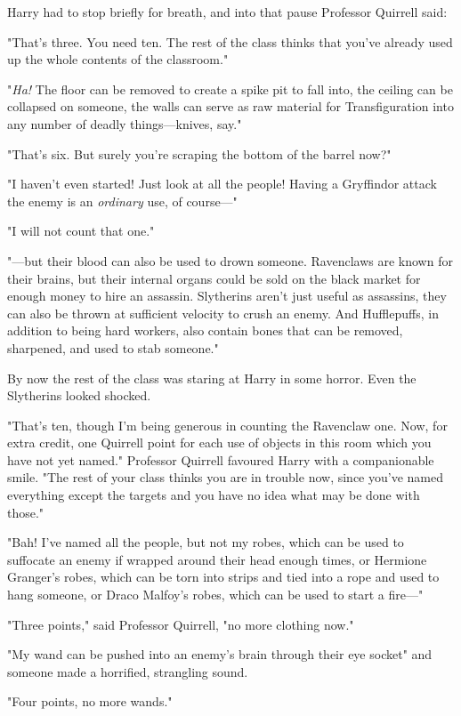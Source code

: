Harry had to stop briefly for breath, and into that pause Professor Quirrell
said:

"That’s three. You need ten. The rest of the class thinks that you’ve already
used up the whole contents of the classroom."

"\emph{Ha!} The floor can be removed to create a spike pit to fall into, the
ceiling can be collapsed on someone, the walls can serve as raw material for
Transfiguration into any number of deadly things—knives, say."

"That’s six. But surely you’re scraping the bottom of the barrel now?"

"I haven’t even started! Just look at all the people! Having a Gryffindor
attack the enemy is an \emph{ordinary} use, of course—"

"I will not count that one."

"—but their blood can also be used to drown someone. Ravenclaws are known for
their brains, but their internal organs could be sold on the black market for
enough money to hire an assassin. Slytherins aren’t just useful as assassins,
they can also be thrown at sufficient velocity to crush an enemy. And
Hufflepuffs, in addition to being hard workers, also contain bones that can be
removed, sharpened, and used to stab someone."

By now the rest of the class was staring at Harry in some horror. Even the
Slytherins looked shocked.

"That’s ten, though I’m being generous in counting the Ravenclaw one. Now, for
extra credit, one Quirrell point for each use of objects in this room which you
have not yet named." Professor Quirrell favoured Harry with a companionable
smile. "The rest of your class thinks you are in trouble now, since you’ve
named everything except the targets and you have no idea what may be done with
those."

"Bah! I’ve named all the people, but not my robes, which can be used to
suffocate an enemy if wrapped around their head enough times, or Hermione
Granger’s robes, which can be torn into strips and tied into a rope and used to
hang someone, or Draco Malfoy’s robes, which can be used to start a fire—"

"Three points," said Professor Quirrell, "no more clothing now."

"My wand can be pushed into an enemy’s brain through their eye socket" and
someone made a horrified, strangling sound.

"Four points, no more wands."


